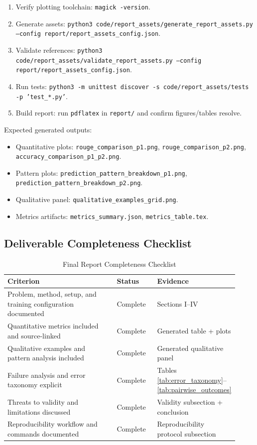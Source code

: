 \documentclass[conference]{IEEEtran}
\begin{document}
\begin{enumerate}
    \item Verify plotting toolchain: \texttt{magick -version}.
    \item Generate assets: \texttt{python3 code/report\_assets/generate\_report\_assets.py --config report/report\_assets\_config.json}.
    \item Validate references: \texttt{python3 code/report\_assets/validate\_report\_assets.py --config report/report\_assets\_config.json}.
    \item Run tests: \texttt{python3 -m unittest discover -s code/report\_assets/tests -p 'test\_*.py'}.
    \item Build report: run \texttt{pdflatex} in \texttt{report/} and confirm figures/tables resolve.
\end{enumerate}

Expected generated outputs:
\begin{itemize}
    \item Quantitative plots: \texttt{rouge\_comparison\_p1.png}, \texttt{rouge\_comparison\_p2.png}, \texttt{accuracy\_comparison\_p1\_p2.png}.
    \item Pattern plots: \texttt{prediction\_pattern\_breakdown\_p1.png}, \texttt{prediction\_pattern\_breakdown\_p2.png}.
    \item Qualitative panel: \texttt{qualitative\_examples\_grid.png}.
    \item Metrics artifacts: \texttt{metrics\_summary.json}, \texttt{metrics\_table.tex}.
\end{itemize}

\subsection{Deliverable Completeness Checklist}

\begin{table}[H]
\centering
\caption{Final Report Completeness Checklist}
\label{tab:completeness_checklist}
\begin{tabular}{p{0.54\linewidth}|p{0.18\linewidth}|p{0.20\linewidth}}
\toprule
Criterion & Status & Evidence \\
\midrule
Problem, method, setup, and training configuration documented & Complete & Sections I--IV \\
\midrule
Quantitative metrics included and source-linked & Complete & Generated table + plots \\
\midrule
Qualitative examples and pattern analysis included & Complete & Generated qualitative panel \\
\midrule
Failure analysis and error taxonomy explicit & Complete & Tables \ref{tab:error_taxonomy}--\ref{tab:pairwise_outcomes} \\
\midrule
Threats to validity and limitations discussed & Complete & Validity subsection + conclusion \\
\midrule
Reproducibility workflow and commands documented & Complete & Reproducibility protocol subsection \\
\bottomrule
\end{tabular}
\end{table}
\end{document}
